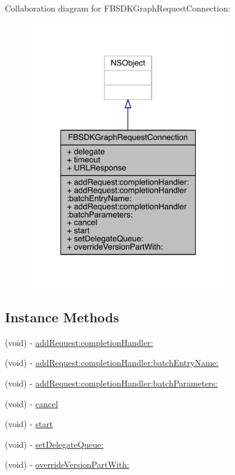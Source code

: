 Collaboration diagram for F\-B\-S\-D\-K\-Graph\-Request\-Connection\-:
\nopagebreak
\begin{figure}[H]
\begin{center}
\leavevmode
\includegraphics[width=246pt]{interface_f_b_s_d_k_graph_request_connection__coll__graph}
\end{center}
\end{figure}
\subsection*{Instance Methods}
\begin{DoxyCompactItemize}
\item 
(void) -\/ \hyperlink{interface_f_b_s_d_k_graph_request_connection_a78390d62d921d5b8a9019b1122b9bfec}{add\-Request\-:completion\-Handler\-:}
\item 
(void) -\/ \hyperlink{interface_f_b_s_d_k_graph_request_connection_a546ecc3c0023510c0497308a5d7a20ea}{add\-Request\-:completion\-Handler\-:batch\-Entry\-Name\-:}
\item 
(void) -\/ \hyperlink{interface_f_b_s_d_k_graph_request_connection_a8c7f18d5ddc46547234e82f92048cdc0}{add\-Request\-:completion\-Handler\-:batch\-Parameters\-:}
\item 
(void) -\/ \hyperlink{interface_f_b_s_d_k_graph_request_connection_ac837293e8959c4aa67fb691c8ac6fbb7}{cancel}
\item 
(void) -\/ \hyperlink{interface_f_b_s_d_k_graph_request_connection_a9801b9b73d40cd2768e4bc9ba85f6686}{start}
\item 
(void) -\/ \hyperlink{interface_f_b_s_d_k_graph_request_connection_a9ac67d71dfa9612c653c34376f7a3196}{set\-Delegate\-Queue\-:}
\item 
(void) -\/ \hyperlink{interface_f_b_s_d_k_graph_request_connection_ade83903924f937d9685b757c1285590f}{override\-Version\-Part\-With\-:}
\end{DoxyCompactItemize}
